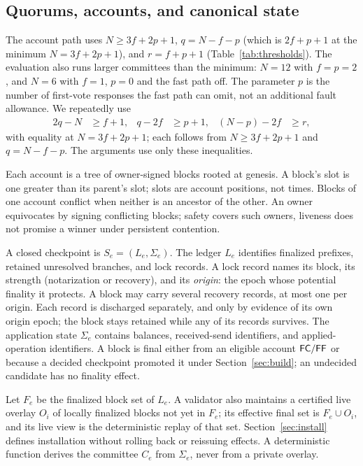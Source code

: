\subsection{Quorums, accounts, and canonical state}
The account path uses $N\ge3f+2p+1$, $q=N-f-p$ (which is $2f+p+1$ at the minimum $N=3f+2p+1$), and $r=f+p+1$ (Table~\ref{tab:thresholds}). The evaluation also runs larger committees than the minimum: $N=12$ with $f=p=2$, and $N=6$ with $f=1$, $p=0$ and the fast path off. The parameter $p$ is the number of first-vote responses the fast path can omit, not an additional fault allowance. We repeatedly use
\begin{align}
2q-N&\ge f+1, & q-2f&\ge p+1, & (N-p)-2f&\ge r,\label{eq:intersect}
\end{align}
with equality at $N=3f+2p+1$; each follows from $N\ge3f+2p+1$ and $q=N-f-p$. The arguments use only these inequalities.

Each account is a tree of owner-signed blocks rooted at genesis. A block's slot is one greater than its parent's slot; slots are account positions, not times. Blocks of one account conflict when neither is an ancestor of the other. An owner equivocates by signing conflicting blocks; safety covers such owners, liveness does not promise a winner under persistent contention.

A closed checkpoint is $S_e=(L_e,\Sigma_e)$. The ledger $L_e$ identifies finalized prefixes, retained unresolved branches, and lock records. A lock record names its block, its strength (notarization or recovery), and its \emph{origin}: the epoch whose potential finality it protects. A block may carry several recovery records, at most one per origin. Each record is discharged separately, and only by evidence of its own origin epoch; the block stays retained while any of its records survives. The application state $\Sigma_e$ contains balances, received-send identifiers, and applied-operation identifiers. A block is final either from an eligible account $\mathsf{FC}/\mathsf{FF}$ or because a decided checkpoint promoted it under Section~\ref{sec:build}; an undecided candidate has no finality effect.

Let $F_e$ be the finalized block set of $L_e$. A validator also maintains a certified live overlay $O_i$ of locally finalized blocks not yet in $F_e$; its effective final set is $F_e\cup O_i$, and its live view is the deterministic replay of that set. Section~\ref{sec:install} defines installation without rolling back or reissuing effects. A deterministic function derives the committee $C_e$ from $\Sigma_e$, never from a private overlay.

